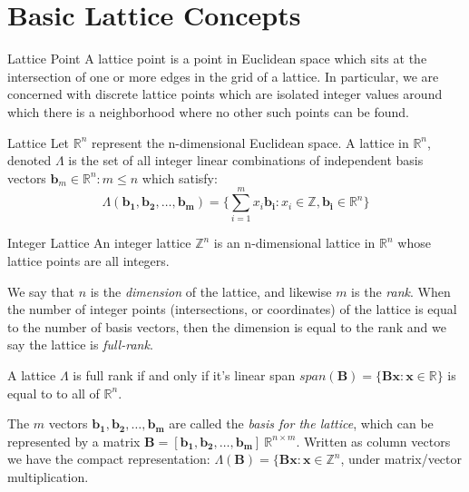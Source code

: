 \section{Basic Lattice Concepts}

\begin{defn}{Lattice Point}
	A lattice point is a point in Euclidean space which sits at the intersection of one or more edges in the grid of a lattice. In particular, we are concerned with discrete lattice points which are isolated integer values around which there is a neighborhood where no other such points can be found.
\end{defn}



\begin{defn}{Lattice}
	Let $\mathbb{R}^{n}$ represent the n-dimensional Euclidean space.
	A lattice in $\mathbb{R}^{n}$, denoted $\Lambda$ is the set of all integer linear combinations of independent basis vectors $\mathbf{b}_{m} \in\mathbb{R}^{n}: m \leq n$ which satisfy:
	\[ \Lambda(\mathbf{b_{1}},\mathbf{b_{2}}, \ldots, \mathbf{b_{m}}) = \bigg \{ \sum_{i=1}^{m} x_{i} \mathbf{b_{i}}: x_{i} \in \mathbb{Z}, \mathbf{b_{i}} \in \mathbb{R}^{n} \bigg \} \]
\end{defn}

\begin{defn}{Integer Lattice}
	An integer lattice $\mathbb{Z}^{n}$ is an n-dimensional lattice in $\mathbb{R}^{n}$ whose lattice points are all integers. 
\end{defn}


We say that $n$ is the \emph{dimension} of the lattice, and likewise $m$ is the \emph{rank}. When the number of integer points (intersections, or coordinates) of the lattice is equal to the number of basis vectors, then the dimension is equal to the rank and we say the lattice is \emph{full-rank}. 

\begin{thm}
	A lattice $\Lambda$ is full rank if and only if it’s linear span $span(\mathbf{B}) = \{\mathbf{Bx}: \mathbf{x} \in \mathbb{R}\}$ is equal to to all of $\mathbb{R}^{n}$. 
\end{thm}


The $m$ vectors $\mathbf{b_{1}},\mathbf{b_{2}}, \ldots, \mathbf{b_{m}}$ are called the \emph{basis for the lattice}, which can be represented by a matrix $\mathbf{B} = [\mathbf{b_{1}},\mathbf{b_{2}}, \ldots, \mathbf{b_{m}}] \ \mathbb{R}^{n \times m}$. 
Written as column vectors we have the compact representation: 
$\Lambda(\mathbf{B}) = \{ \mathbf{Bx}: \mathbf{x} \in \mathbb{Z}^{n}$, under matrix/vector multiplication. 


